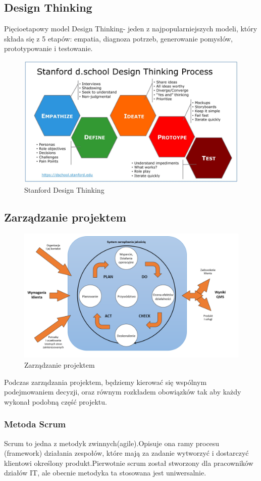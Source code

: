 \documentclass[a4paper, titleauthor]{mwart}
\begin{document}
\subsection{Design Thinking}
\label{sec:design_thinking}
Pięcioetapowy model Design Thinking- jeden z najpopularniejszych modeli, który składa się z 5 etapów: empatia, diagnoza potrzeb, generowanie pomysłów, prototypowanie i testowanie.
\begin{figure}[h]
\centering
    \includegraphics[width=0.8\linewidth]{Stanford-Design-Thinking-Process.jpg}
    \caption{Stanford Design Thinking}
\end{figure}

\subsection{Zarządzanie projektem}
\label{sec:zarządzanie_projektem}
\begin{figure}[h]
\centering
    \includegraphics[width=0.8\linewidth]{Zarzadzanie.png}
    \caption{Zarządzanie projektem}
\end{figure}
Podczas zarządzania projektem, będziemy kierować się wspólnym podejmowaniem decyzji, oraz równym rozkładem obowiązków tak aby każdy wykonał podobną część projektu.
\subsubsection{Metoda Scrum}
Scrum to jedna z metodyk zwinnych(agile).Opisuje ona ramy procesu (framework) działania zespołów, które mają za zadanie wytworzyć i dostarczyć klientowi określony produkt.Pierwotnie scrum został stworzony dla pracowników działów IT, ale obecnie metodyka ta stosowana jest uniwersalnie.
\end{document}
